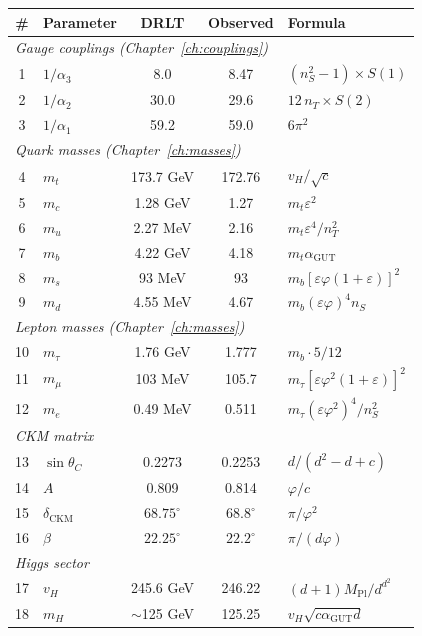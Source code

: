 \documentclass[12pt]{article}
\theoremstyle{remark}
\theoremstyle{definition}
\begin{document}
\begin{center}
\small
\begin{tabular}{clccl}
\hline
\# & Parameter & DRLT & Observed & Formula \\
\hline
\multicolumn{5}{l}{\emph{Gauge couplings (Chapter~\ref{ch:couplings})}} \\
1 & $1/\alpha_3$ & 8.0 & 8.47 & $(n_S^2-1) \times S(1)$ \\
2 & $1/\alpha_2$ & 30.0 & 29.6 & $12\,n_T \times S(2)$ \\
3 & $1/\alpha_1$ & 59.2 & 59.0 & $6\pi^2$ \\
\hline
\multicolumn{5}{l}{\emph{Quark masses (Chapter~\ref{ch:masses})}} \\
4 & $m_t$ & 173.7 GeV & 172.76 & $v_H/\sqrt{c}$ \\
5 & $m_c$ & 1.28 GeV & 1.27 & $m_t\varepsilon^2$ \\
6 & $m_u$ & 2.27 MeV & 2.16 & $m_t\varepsilon^4/n_T^2$ \\
7 & $m_b$ & 4.22 GeV & 4.18 & $m_t\alpha_\text{GUT}$ \\
8 & $m_s$ & 93 MeV & 93 & $m_b[\varepsilon\varphi(1\!+\!\varepsilon)]^2$ \\
9 & $m_d$ & 4.55 MeV & 4.67 & $m_b(\varepsilon\varphi)^4 n_S$ \\
\hline
\multicolumn{5}{l}{\emph{Lepton masses (Chapter~\ref{ch:masses})}} \\
10 & $m_\tau$ & 1.76 GeV & 1.777 & $m_b \cdot 5/12$ \\
11 & $m_\mu$ & 103 MeV & 105.7 & $m_\tau[\varepsilon\varphi^2(1\!+\!\varepsilon)]^2$ \\
12 & $m_e$ & 0.49 MeV & 0.511 & $m_\tau(\varepsilon\varphi^2)^4/n_S^2$ \\
\hline
\multicolumn{5}{l}{\emph{CKM matrix}} \\
13 & $\sin\theta_C$ & 0.2273 & 0.2253 & $d/(d^2\!-\!d\!+\!c)$ \\
14 & $A$ & 0.809 & 0.814 & $\varphi/c$ \\
15 & $\delta_\text{CKM}$ & $68.75^\circ$ & $68.8^\circ$ & $\pi/\varphi^2$ \\
16 & $\beta$ & $22.25^\circ$ & $22.2^\circ$ & $\pi/(d\varphi)$ \\
\hline
\multicolumn{5}{l}{\emph{Higgs sector}} \\
17 & $v_H$ & 245.6 GeV & 246.22 & $(d\!+\!1)M_\text{Pl}/d^{d^2}$ \\
18 & $m_H$ & $\sim$125 GeV & 125.25 & $v_H\sqrt{c\alpha_\text{GUT}d}$ \\
\hline

\end{tabular}
\end{center}
\end{document}
